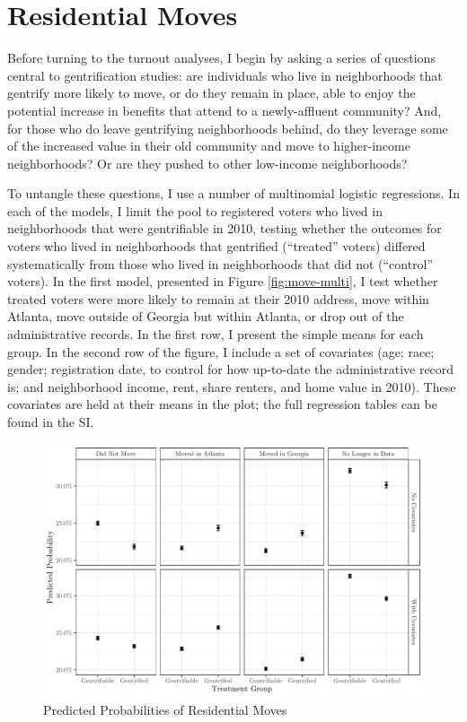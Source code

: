 \documentclass[
  12pt,
]{article}
\begin{document}
\hypertarget{residential-moves}{%
\section{Residential Moves}\label{residential-moves}}

Before turning to the turnout analyses, I begin by asking a series of questions central to gentrification studies: are individuals who live in neighborhoods that gentrify more likely to move, or do they remain in place, able to enjoy the potential increase in benefits that attend to a newly-affluent community? And, for those who do leave gentrifying neighborhoods behind, do they leverage some of the increased value in their old community and move to higher-income neighborhoods? Or are they pushed to other low-income neighborhoods?

To untangle these questions, I use a number of multinomial logistic regressions. In each of the models, I limit the pool to registered voters who lived in neighborhoods that were gentrifiable in 2010, testing whether the outcomes for voters who lived in neighborhoods that gentrified (``treated'' voters) differed systematically from those who lived in neighborhoods that did not (``control'' voters). In the first model, presented in Figure \ref{fig:move-multi}, I test whether treated voters were more likely to remain at their 2010 address, move within Atlanta, move outside of Georgia but within Atlanta, or drop out of the administrative records. In the first row, I present the simple means for each group. In the second row of the figure, I include a set of covariates (age; race; gender; registration date, to control for how up-to-date the administrative record is; and neighborhood income, rent, share renters, and home value in 2010). These covariates are held at their means in the plot; the full regression tables can be found in the SI.

\begin{figure}[H]

{\centering \includegraphics{gentrification_files/figure-latex/move-marg-1} 

}

\caption{\label{fig:move-multi}Predicted Probabilities of Residential Moves}\label{fig:move-marg}
\end{figure}
\end{document}
